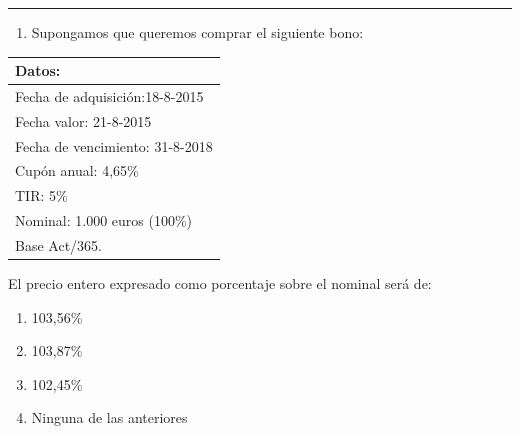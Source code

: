 \documentclass[
  letterpaper,
  DIV=11,
  numbers=noendperiod]{scrreprt}
\providecommand{\tightlist}{%
  \setlength{\itemsep}{0pt}\setlength{\parskip}{0pt}}\usepackage{longtable,booktabs,array}
\begin{document}
\begin{center}\rule{0.5\linewidth}{0.5pt}\end{center}

\begin{enumerate}
\def\labelenumi{\arabic{enumi}.}
\setcounter{enumi}{29}
\tightlist
\item
  Supongamos que queremos comprar el siguiente bono:
\end{enumerate}

\begin{longtable}[]{@{}l@{}}
\toprule()
\textbf{Datos:} \\
\midrule()
\endhead
Fecha de adquisición:18-8-2015 \\
Fecha valor: 21-8-2015 \\
Fecha de vencimiento: 31-8-2018 \\
Cupón anual: 4,65\% \\
TIR: 5\% \\
Nominal: 1.000 euros (100\%) \\
Base Act/365. \\
\bottomrule()
\end{longtable}

El precio entero expresado como porcentaje sobre el nominal será de:

\begin{enumerate}
\def\labelenumi{\alph{enumi}.}
\item
  103,56\%
\item
  103,87\%
\item
  102,45\%
\item
  Ninguna de las anteriores
\end{enumerate}
\end{document}
